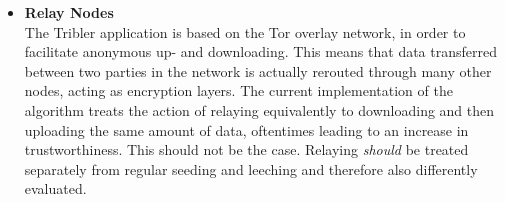 \documentclass[twocolumn]{article}
\theoremstyle{definition}
\theoremstyle{theorem}
\begin{document}
\begin{itemize}
\item {\bf Relay Nodes} \\ The Tribler application is based on the Tor overlay network, in order to facilitate anonymous up- and downloading. This means that data transferred between two parties in the network is actually rerouted through many other nodes, acting as encryption layers. The current implementation of the algorithm treats the action of relaying equivalently to downloading and then uploading the same amount of data, oftentimes leading to an increase in trustworthiness. This should not be the case. Relaying {\it should} be treated separately from regular seeding and leeching and therefore also differently evaluated. 
\end{itemize}
\end{document}
